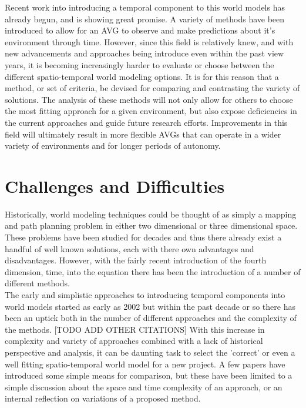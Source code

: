   Recent work into introducing a temporal component to this world models has
  already begun, and is showing great promise. A variety of methods have been
  introduced to allow for an AVG to observe and make predictions about it's
  environment through time. However, since this field is relatively knew, and
  with new advancements and approaches being introduce even within the past view
  years, it is becoming increasingly harder to evaluate or choose between the
  different spatio-temporal world modeling options. It is for this reason that a
  method, or set of criteria, be devised for comparing and contrasting the
  variety of solutions. The analysis of these methods will not only allow for
  others to choose the most fitting approach for a given environment, but also
  expose deficiencies in the current approaches and guide future research
  efforts. Improvements in this field will ultimately result in more flexible
  AVGs that can operate in a wider variety of environments and for longer
  periods of autonomy.

  \section{ Challenges and Difficulties }

  Historically, world modeling techniques could be thought of as simply a mapping
  and path planning problem in either two dimensional or three dimensional space.
  These problems have been studied for decades and thus there already exist a
  handful of well known solutions, each with there own advantages and
  disadvantages. However, with the fairly recent introduction of the fourth
  dimension, time, into the equation there has been the introduction of a number
  of different methods. \\

  The early and simplistic approaches to introducing temporal components into
  world models started as early as 2002 \cite{Arbuckle2002} but within the past
  decade or so there has been an uptick both in the number of different
  approaches and the complexity of the methods. \cite{Krajnik2017} [TODO ADD
  OTHER CITATIONS] With this increase in complexity and variety of approaches
  combined with a lack of historical perspective and analysis, it can be
  daunting task to select the 'correct' or even a well fitting spatio-temporal
  world model for a new project. A few papers have introduced some simple means
  for comparison, but these have been limited to a simple discussion about the
  space and time complexity of an approach, or an internal reflection on
  variations of a proposed method.


